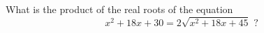 What is the product of the real roots of the equation \[x^2 + 18x + 30 = 2 \sqrt{x^2 + 18x + 45}\,\,?\]